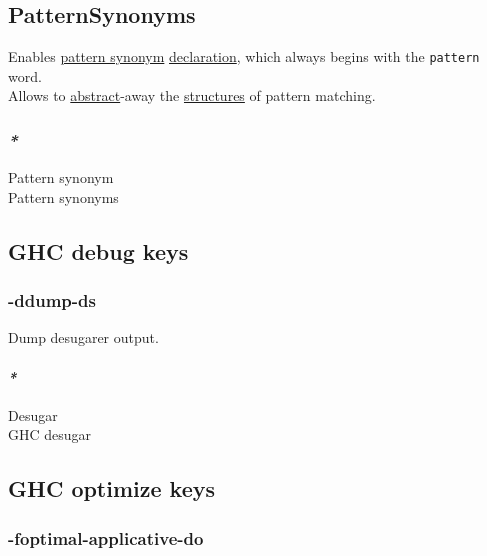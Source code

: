 \documentclass[11pt]{article}
\begin{document}
\subsection{\label{orgcf6ac50}PatternSynonyms}
\label{sec:orgc221ea6}
Enables \hyperref[org0596644]{pattern synonym} \hyperref[org8fbd848]{declaration}, which always begins with the \texttt{pattern} word.\\
Allows to \hyperref[orgbbe9132]{abstract}-away the \hyperref[orgc87c48c]{structures} of pattern matching.\\

\subsubsection{\emph{*}}
\label{sec:org0e729ca}

\label{org0596644}Pattern synonym\\
\label{orge249291}Pattern synonyms\\

\subsection{\label{org7bfe468}GHC debug keys}
\label{sec:orgf38b0f2}

\subsubsection{\label{orgb88e189}-ddump-ds}
\label{sec:org31730af}

Dump desugarer output.\\

\paragraph{\emph{*}}
\label{sec:org874e8a5}

\label{org6043baa}Desugar\\
\label{org57272e8}GHC desugar\\

\subsection{\label{org25c4ae6}GHC optimize keys}
\label{sec:orgdf68cf6}

\subsubsection{\label{org78d710f}-foptimal-applicative-do}
\label{sec:orgf99b8ff}
\end{document}
